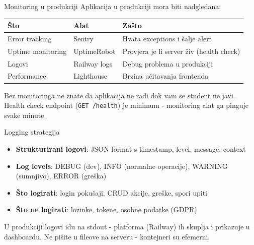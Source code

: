 \begin{frame}{Monitoring u produkciji}
Aplikacija u produkciji mora biti nadgledana:

\vspace{0.4em}
\begin{tabular}{@{}lp{4cm}p{5cm}@{}}
  \toprule
  \textbf{Što} & \textbf{Alat} & \textbf{Zašto} \\
  \midrule
  Error tracking & Sentry & Hvata exceptions i šalje alert \\
  Uptime monitoring & UptimeRobot & Provjera je li server živ (health check) \\
  Logovi & Railway logs & Debug problema u produkciji \\
  Performance & Lighthouse & Brzina učitavanja frontenda \\
  \bottomrule
\end{tabular}

\vspace{0.6em}
Bez monitoringa ne znate da aplikacija ne radi dok vam se student ne javi. Health check endpoint (\texttt{GET /health}) je minimum - monitoring alat ga pinguje svake minute.
\end{frame}

\begin{frame}{Logging strategija}
\begin{itemize}
  \item \textbf{Strukturirani logovi}: JSON format s timestamp, level, message, context
  \item \textbf{Log levels}: DEBUG (dev), INFO (normalne operacije), WARNING (sumnjivo), ERROR (greška)
  \item \textbf{Što logirati}: login pokušaji, CRUD akcije, greške, spori upiti
  \item \textbf{Što ne logirati}: lozinke, tokene, osobne podatke (GDPR)
\end{itemize}

\vspace{0.6em}
U produkciji logovi idu na stdout - platforma (Railway) ih skuplja i prikazuje u dashboardu. Ne pišite u fileove na serveru - kontejneri su efemerni.
\end{frame}

